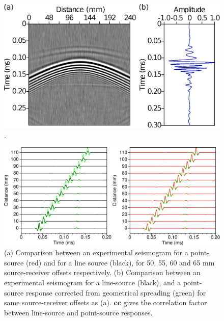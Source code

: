 \documentclass[manuscript,revised]{geophysics}
\begin{document}
\begin{figure}[!h]
	\centering
	\includegraphics[scale=0.4]{fig/amplitude_stack_principle.eps}
	\caption{.}
	\label{amplitude_stack_principle}
\end{figure}

\begin{figure}[!h]
	\centering
	\includegraphics[scale=0.5]{fig/trans2d3d.eps}
	\caption{(a) Comparison between an experimental seismogram for a point-source (red) and for a line source (black), for 50, 55, 60 and 65 mm source-receiver offsets respectively. (b) Comparison between an experimental seismogram for a line-source (black), and a point-source response corrected from geometrical spreading (green) for same source-receiver offsets as (a). \textbf{cc} gives the correlation factor between line-source and point-source responses.}
	\label{panel_amplitude}
\end{figure}
\end{document}
